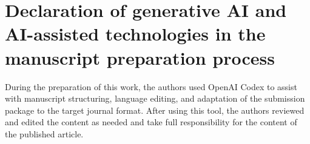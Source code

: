 \documentclass[preprint,12pt,authoryear]{elsarticle}
\begin{document}
\section*{Declaration of generative AI and AI-assisted technologies in the manuscript preparation process}

During the preparation of this work, the authors used OpenAI Codex to assist with manuscript structuring, language editing, and adaptation of the submission package to the target journal format. After using this tool, the authors reviewed and edited the content as needed and take full responsibility for the content of the published article.



\end{document}
